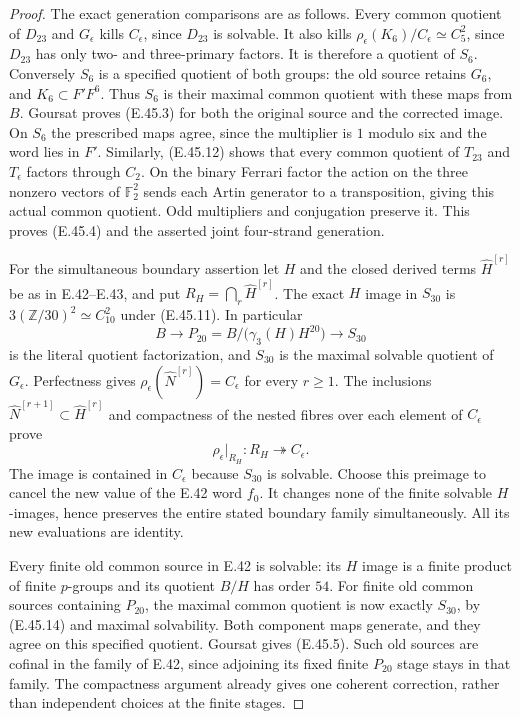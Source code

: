 \begin{proof}
The exact generation comparisons are as follows.
Every common quotient of $D_{23}$ and $G_\epsilon$ kills
$C_\epsilon$, since $D_{23}$ is solvable.  It also kills
$\rho_\epsilon(K_6)/C_\epsilon\simeq C_5^2$, since
$D_{23}$ has only two- and three-primary factors.
It is therefore a quotient of $S_6$.  Conversely $S_6$ is
a specified quotient of both groups: the old source retains
$G_6$, and $K_6\subset F'F^6$.
Thus $S_6$ is their maximal common quotient with these maps
from $B$.  Goursat proves \textup{(E.45.3)} for both the original
source and the corrected image.  On $S_6$ the prescribed
maps agree, since the multiplier is $1$ modulo six and
the word lies in $F'$.
Similarly, \textup{(E.45.12)} shows that every common quotient
of $T_{23}$ and $T_\epsilon$ factors through $C_2$.
On the binary Ferrari factor the action on the three nonzero
vectors of $\mathbb F_2^2$ sends each Artin generator to a
transposition, giving this actual common quotient.
Odd multipliers and conjugation preserve it.  This proves
\textup{(E.45.4)} and the asserted joint four-strand generation.

For the simultaneous boundary assertion let $H$ and the closed
derived terms $\widehat H^{[r]}$ be as in E.42--E.43, and put
$R_H=\bigcap_r\widehat H^{[r]}$.
The exact $H$ image in $S_{30}$ is
$3(\mathbb Z/30)^2\simeq C_{10}^2$ under
\textup{(E.45.11)}.  In particular
\[
 B\longrightarrow P_{20}
       =B/\bigl(\gamma_3(H)H^{20}\bigr)
                         \longrightarrow S_{30}
 \tag{E.45.14}
\]
is the literal quotient factorization, and $S_{30}$ is the
maximal solvable quotient of $G_\epsilon$.
Perfectness gives $\rho_\epsilon(\widehat N^{[r]})=C_\epsilon$
for every $r\ge1$.  The inclusions
$\widehat N^{[r+1]}\subset\widehat H^{[r]}$ and compactness of
the nested fibres over each element of $C_\epsilon$ prove
\[
                  \rho_\epsilon|_{R_H}:R_H\twoheadrightarrow C_\epsilon.
 \tag{E.45.15}
\]
The image is contained in $C_\epsilon$ because $S_{30}$ is
solvable.  Choose this preimage to cancel the new value of the
E.42 word $f_0$.  It changes none of the finite solvable
$H$-images, hence preserves the entire stated boundary family
simultaneously.  All its new evaluations are identity.

Every finite old common source in E.42 is solvable: its
$H$ image is a finite product of finite $p$-groups and its
quotient $B/H$ has order $54$.
For finite old common sources containing $P_{20}$, the maximal
common quotient is now exactly $S_{30}$, by
\textup{(E.45.14)} and maximal solvability.
Both component maps generate, and they agree on this specified
quotient.  Goursat gives \textup{(E.45.5)}.  Such old sources are
cofinal in the family of E.42, since adjoining its fixed finite
$P_{20}$ stage stays in that family.  The compactness argument
already gives one coherent correction, rather than independent
choices at the finite stages.


\end{proof}
